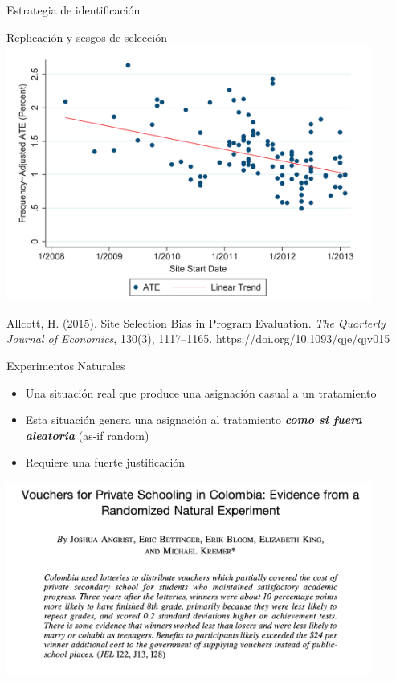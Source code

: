\documentclass[
  ignorenonframetext,
]{beamer}
\begin{document}
\begin{frame}{Estrategia de identificación}
\begin{frame}{Replicación y sesgos de selección}
\protect\hypertarget{replicaciuxf3n-y-sesgos-de-selecciuxf3n}{}
\includegraphics[width=0.9\textwidth,height=\textheight]{figs/allcott_selectionbias_plot.png}

\begin{tiny}
Allcott, H. (2015). Site Selection Bias in Program Evaluation. \textit{The Quarterly Journal of Economics}, 130(3), 1117–1165. https://doi.org/10.1093/qje/qjv015
\end{tiny}
\end{frame}

\begin{frame}{Experimentos Naturales}
\protect\hypertarget{experimentos-naturales}{}
\begin{itemize}
\item
  Una situación real que produce una asignación casual a un tratamiento
\item
  Esta situación genera una asignación al tratamiento \textbf{\emph{como
  si fuera aleatoria}} (as-if random)
\item
  Requiere una fuerte justificación
\end{itemize}
\end{frame}

\begin{frame}{}
\protect\hypertarget{section-1}{}
\includegraphics[width=0.9\textwidth,height=\textheight]{figs/angrist_NatExp.png}


\end{frame}
\end{frame}
\end{document}
